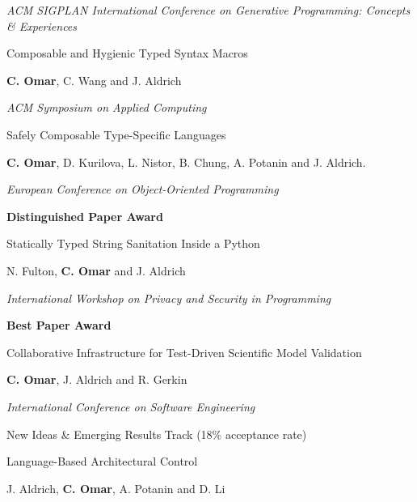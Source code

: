 \documentclass[10pt,letterpaper]{article}
\renewenvironment{itemize}{
  \begin{list}{}{
    \setlength{\leftmargin}{1.25em}
    \setlength{\itemsep}{0.25em}
    \setlength{\parskip}{0pt}
    \setlength{\parsep}{0.2em}
  }
}{
  \end{list}
}
\begin{document}
\begin{enumerate}[leftmargin=*, labelindent=6.5em, font=\bfseries]
\begin{itemize}
          \item \textit{ACM SIGPLAN International Conference on Generative Programming: Concepts \& Experiences}
        \end{itemize}
  \item[SAC 2015] Composable and Hygienic Typed Syntax Macros
        \begin{itemize}
          \item \textbf{C. Omar}, C. Wang and J. Aldrich
          \item \textit{ACM Symposium on Applied Computing}
        \end{itemize}
  \item[ECOOP 2014] {Safely Composable Type-Specific Languages}
        \begin{itemize}
          \item \textbf{C. Omar}, D. Kurilova, L. Nistor, B. Chung, A. Potanin and J. Aldrich.
          \item \textit{European Conference on Object-Oriented Programming}
          \item \textbf{Distinguished Paper Award}
        \end{itemize}
  \item[PSP 2014] Statically Typed String Sanitation Inside a Python
        \begin{itemize}
          \item N. Fulton, \textbf{C. Omar} and J. Aldrich
          \item \textit{International Workshop on Privacy and Security in Programming}
          \item \textbf{Best Paper Award}
        \end{itemize}
  \item[ICSE 2014] Collaborative Infrastructure for Test-Driven Scientific Model Validation
        \begin{itemize}
          \item \textbf{C. Omar}, J. Aldrich and R. Gerkin
          \item \textit{International Conference on Software Engineering}
          \item New Ideas \& Emerging Results Track (18\% acceptance rate)
        \end{itemize}
  \item[IWACO 2014] Language-Based Architectural Control
        \begin{itemize}
          \item J. Aldrich, \textbf{C. Omar}, A. Potanin and D. Li

\end{itemize}
\end{enumerate}
\end{document}
